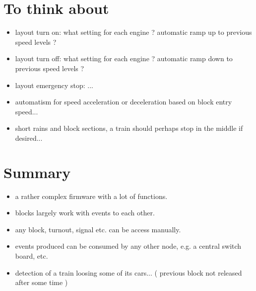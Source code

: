 \section{To think about}

\begin{itemize}
\item layout turn on: what setting for each engine ? automatic ramp up to previous speed levels ?
\item layout turn off: what setting for each engine ? automatic ramp down to previous speed levels ?
\item layout emergency stop: ...
\item automatism for speed acceleration or deceleration based on block entry speed...
\item short rains and block sections, a train should perhaps stop in the middle if desired...
\end{itemize}

\section{Summary}

\begin{itemize}
\item a rather complex firmware with a lot of functions.
\item blocks largely work with events to each other.
\item any block, turnout, signal etc. can be access manually.
\item events produced can be consumed by any other node, e.g. a central switch board, etc.
\item detection of a train loosing some of its cars... ( previous block not released after some time )
\end{itemize}
